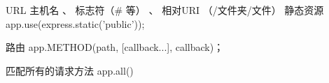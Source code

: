 URL
主机名 、 标志符（# 等） 、 相对URI （/文件夹/文件）
静态资源
app.use(express.static('public'));

路由
 app.METHOD(path, [callback...], callback)；

匹配所有的请求方法
 app.all()

